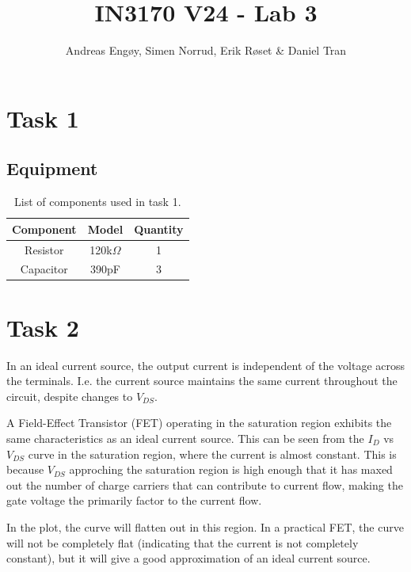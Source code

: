 \documentclass[onecolumn]{article}
\title{IN3170 V24 - Lab 3}
\author{Andreas Engøy, Simen Norrud, Erik Røset \& Daniel Tran}
\date{\monthname[\the\month] \the\year}
\begin{document}
\maketitle


\section{Task 1}
\subsection{Equipment}
\begin{table}[h]
    \centering
    \begin{tabular}{|c|c|c|}
        \hline
        \textbf{Component} & \textbf{Model} & \textbf{Quantity} \\
        \hline
        Resistor & 120k$\Omega$ & 1 \\
        Capacitor & 390pF & 3 \\

        \hline
    \end{tabular}
    \caption{List of components used in task 1.}
    \label{tab:bom}
\end{table}



\section{Task 2}
In an ideal current source, the output current is independent of the voltage across the terminals. I.e. the current source maintains the same current throughout the circuit, despite changes to $V_{DS}$.

A Field-Effect Transistor (FET) operating in the saturation region exhibits the same characteristics as an ideal current source. This can be seen from the $I_D$ vs $V_{DS}$ curve in the saturation region, where the current is almost constant. This is because $V_{DS}$ approching the saturation region is high enough that it has maxed out the number of charge carriers that can contribute to current flow, making the gate voltage the primarily factor to the current flow.

In the plot, the curve will flatten out in this region. In a practical FET, the curve will not be completely flat (indicating that the current is not completely constant), but it will give a good approximation of an ideal current source.
\end{document}
